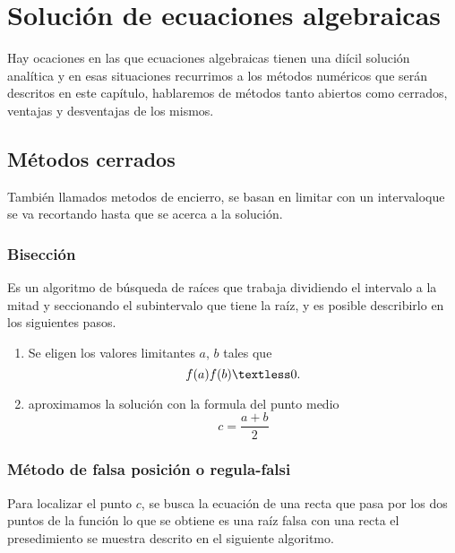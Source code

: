 \chapter{Soluci\'on de ecuaciones algebraicas}


Hay ocaciones en las que ecuaciones algebraicas tienen una di\'icil soluci\'on anal\'itica y en esas situaciones recurrimos a los m\'etodos num\'ericos que ser\'an descritos en este cap\'itulo, hablaremos de m\'etodos tanto abiertos como cerrados, ventajas y desventajas de los mismos. 

\section{M\'etodos cerrados}
Tambi\'en llamados metodos de encierro, se basan en limitar con un intervaloque se va recortando hasta que se acerca a la soluci\'on.

\subsection{Bisecci\'on}
Es un algoritmo de b\'usqueda de ra\'ices que trabaja dividiendo el intervalo a la mitad y seccionando el subintervalo que tiene la ra\'iz, y es posible describirlo en los siguientes pasos.\\
\begin{center}
\begin{enumerate}
\item Se eligen los valores limitantes $a$,  $b$ tales que 
\begin{displaymath}
f(a)f(b)\textless0.
\end{displaymath}
\item aproximamos la soluci\'on con la formula del punto medio
\begin{displaymath}
c=\frac{a+b}{2}
\end{displaymath}
\end{enumerate}
\end{center}
\subsection{M\'etodo de falsa posici\'on o regula-falsi}
Para localizar el punto $c$, se busca la ecuaci\'on de una recta que pasa por los dos puntos de la funci\'on lo que se obtiene es una ra\'iz falsa con una recta el presedimiento se muestra descrito en el siguiente algoritmo.

